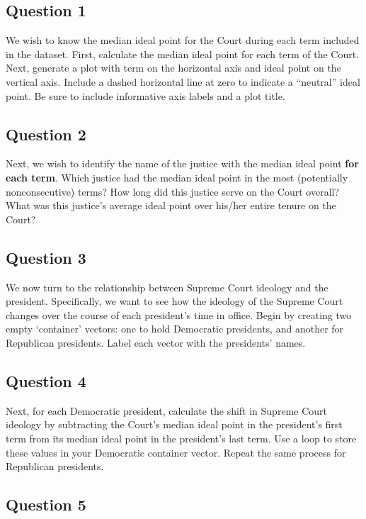 \documentclass[]{article}
\begin{document}
\subsection{Question 1}\label{question-1}

We wish to know the median ideal point for the Court during each term
included in the dataset. First, calculate the median ideal point for
each term of the Court. Next, generate a plot with term on the
horizontal axis and ideal point on the vertical axis. Include a dashed
horizontal line at zero to indicate a ``neutral'' ideal point. Be sure
to include informative axis labels and a plot title.

\subsection{Question 2}\label{question-2}

Next, we wish to identify the name of the justice with the median ideal
point \textbf{for each term}. Which justice had the median ideal point
in the most (potentially nonconsecutive) terms? How long did this
justice serve on the Court overall? What was this justice's average
ideal point over his/her entire tenure on the Court?

\subsection{Question 3}\label{question-3}

We now turn to the relationship between Supreme Court ideology and the
president. Specifically, we want to see how the ideology of the Supreme
Court changes over the course of each president's time in office. Begin
by creating two empty `container' vectors: one to hold Democratic
presidents, and another for Republican presidents. Label each vector
with the presidents' names.

\subsection{Question 4}\label{question-4}

Next, for each Democratic president, calculate the shift in Supreme
Court ideology by subtracting the Court's median ideal point in the
president's first term from its median ideal point in the president's
last term. Use a loop to store these values in your Democratic container
vector. Repeat the same process for Republican presidents.

\subsection{Question 5}\label{question-5}
\end{document}
